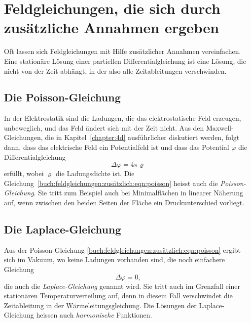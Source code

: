 %
%
\section{Feldgleichungen, die sich durch zusätzliche Annahmen ergeben}
Oft lassen sich Feldgleichungen mit Hilfe zusätzlicher Annahmen
vereinfachen.
Eine stationäre Lösung einer partiellen Differentialgleichung ist
eine Lösung, die nicht von der Zeit abhängt, in der also alle
Zeitableitungen verschwinden.

\subsection{Die Poisson-Gleichung}
In der Elektrostatik sind die Ladungen, die das elektrostatische
Feld erzeugen, unbeweglich, und das Feld ändert sich mit der Zeit
nicht.
Aus den Maxwell-Gleichungen, die in Kapitel~\ref{chapter:4d}
ausführlicher diskutiert werden, folgt dann, dass das elektrische
Feld ein Potentialfeld ist und dass das Potential $\varphi$ die
Differentialgleichung
\begin{equation}
\Delta \varphi = 4\pi \varrho
\label{buch:feldgleichungen:zusätzlich:eqn:poisson}
\end{equation}
erfüllt, wobei $\varrho$ die Ladungsdichte ist.
Die Gleichung~\eqref{buch:feldgleichungen:zusätzlich:eqn:poisson}
heisst auch die {\em Poisson-Gleichung}.
%
Sie tritt zum Beispiel auch bei Minimalflächen in linearer Näherung
auf, wenn zwischen den beiden Seiten der Fläche ein Druckunterschied
vorliegt.

\subsection{Die Laplace-Gleichung}
Aus der Poisson-Gleichung \eqref{buch:feldgleichungen:zusätzlich:eqn:poisson}
ergibt sich im Vakuum, wo keine Ladungen vorhanden sind, die noch
einfachere Gleichung
\[
\Delta \varphi = 0,
\]
die auch die {\em Laplace-Gleichung} genannt wird.
%
Sie tritt auch im Grenzfall einer stationären Temperaturverteilung
auf, denn in diesem Fall verschwindet die Zeitableitung in der
Wärmeleitungsgleichung.
Die Lösungen der Laplace-Gleichung heissen auch {\em harmonische} 
Funktionen.

